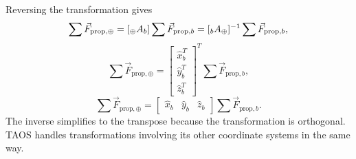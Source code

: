 Reversing the transformation gives
\begin{equation}
  \sum\vec F_{\mathrm{prop},\oplus}
  =[{}_{\oplus}A_{b}]\sum\vec F_{\mathrm{prop},b}
  =[{}_{b}A_{\oplus}]^{-1}
    \sum\vec F_{\mathrm{prop},b},
  \label{eq:body-to-ecfc-force-transformation}
\end{equation}
\begin{equation}
  \sum\vec F_{\mathrm{prop},\oplus}
  =
  \begin{bmatrix}
    \hat x_b^{T}\\[0.2em]
    \hat y_b^{T}\\[0.2em]
    \hat z_b^{T}
  \end{bmatrix}^{T}
  \sum\vec F_{\mathrm{prop},b},
  \label{eq:body-to-ecfc-force-transformation-transpose}
\end{equation}
\begin{equation}
  \sum\vec F_{\mathrm{prop},\oplus}
  =
  \begin{bmatrix}
    \hat x_b&\hat y_b&\hat z_b
  \end{bmatrix}
  \sum\vec F_{\mathrm{prop},b}.
  \label{eq:body-to-ecfc-force-transformation-columns}
\end{equation}
The inverse simplifies to the transpose because the transformation is orthogonal.
TAOS handles transformations involving its other coordinate systems in the same
way.
